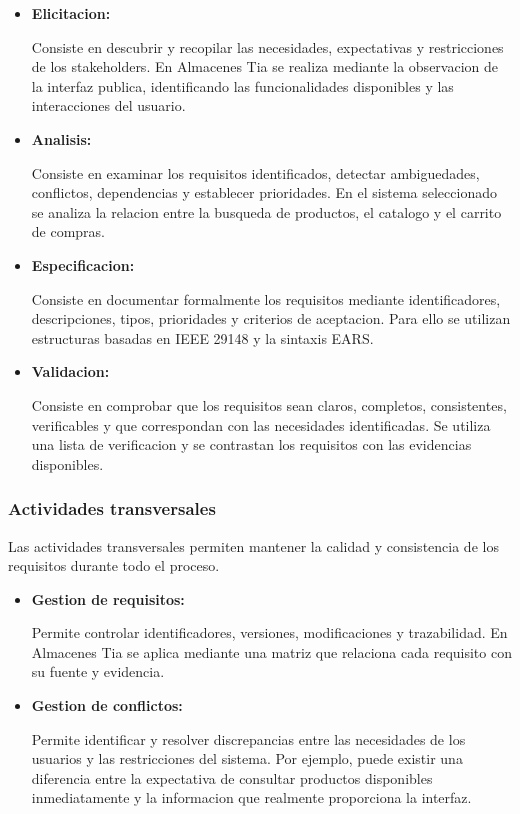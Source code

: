 \documentclass[12pt,a4paper]{article}
\begin{document}
\begin{itemize}

    \item \textbf{Elicitacion:}

    Consiste en descubrir y recopilar las necesidades,
    expectativas y restricciones de los stakeholders.
    En Almacenes Tia se realiza mediante la observacion
    de la interfaz publica, identificando las
    funcionalidades disponibles y las interacciones
    del usuario.

    \item \textbf{Analisis:}

    Consiste en examinar los requisitos identificados,
    detectar ambiguedades, conflictos, dependencias
    y establecer prioridades. En el sistema seleccionado
    se analiza la relacion entre la busqueda de productos,
    el catalogo y el carrito de compras.

    \item \textbf{Especificacion:}

    Consiste en documentar formalmente los requisitos
    mediante identificadores, descripciones, tipos,
    prioridades y criterios de aceptacion. Para ello
    se utilizan estructuras basadas en IEEE 29148
    y la sintaxis EARS.

    \item \textbf{Validacion:}

    Consiste en comprobar que los requisitos sean
    claros, completos, consistentes, verificables
    y que correspondan con las necesidades identificadas.
    Se utiliza una lista de verificacion y se contrastan
    los requisitos con las evidencias disponibles.

\end{itemize}

\subsubsection{Actividades transversales}

Las actividades transversales permiten mantener
la calidad y consistencia de los requisitos durante
todo el proceso.

\begin{itemize}

    \item \textbf{Gestion de requisitos:}

    Permite controlar identificadores, versiones,
    modificaciones y trazabilidad. En Almacenes Tia
    se aplica mediante una matriz que relaciona
    cada requisito con su fuente y evidencia.

    \item \textbf{Gestion de conflictos:}

    Permite identificar y resolver discrepancias
    entre las necesidades de los usuarios y las
    restricciones del sistema. Por ejemplo, puede
    existir una diferencia entre la expectativa
    de consultar productos disponibles inmediatamente
    y la informacion que realmente proporciona
    la interfaz.

\end{itemize}
\end{document}
